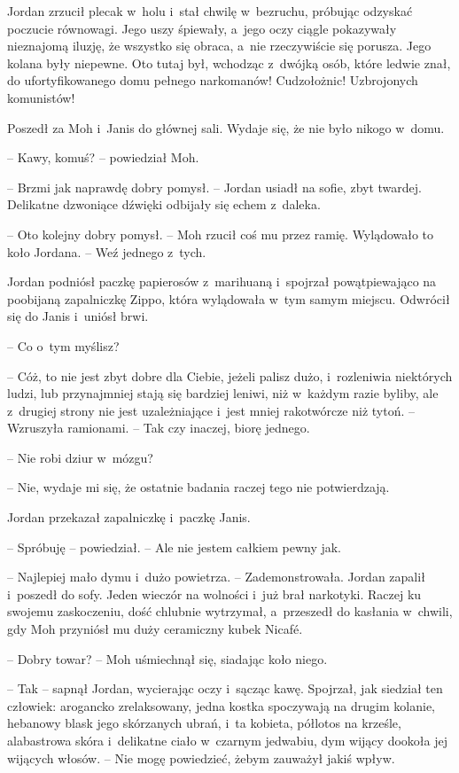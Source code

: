\documentclass[oneside,polish,11pt,sfheadings]{mwbk}
\begin{document}
Jordan zrzucił plecak w~holu i~stał chwilę w~bezruchu, próbując odzyskać
poczucie równowagi. Jego uszy śpiewały, a~jego oczy ciągle pokazywały
nieznajomą iluzję, że wszystko się obraca, a~nie rzeczywiście się
porusza. Jego kolana były niepewne. Oto tutaj był, wchodząc z~dwójką
osób, które ledwie znał, do ufortyfikowanego domu pełnego narkomanów!
Cudzołożnic! Uzbrojonych komunistów!

Poszedł za Moh i~Janis do głównej sali. Wydaje się, że nie było nikogo w~domu.

-- Kawy, komuś? -- powiedział Moh.

-- Brzmi jak naprawdę dobry pomysł. -- Jordan usiadł na sofie, zbyt
twardej. Delikatne dzwoniące dźwięki odbijały się echem z~daleka.

-- Oto kolejny dobry pomysł. -- Moh rzucił coś mu przez ramię. Wylądowało
to koło Jordana. -- Weź jednego z~tych.

Jordan podniósł paczkę papierosów z~marihuaną i~spojrzał powątpiewająco
na poobijaną zapalniczkę Zippo, która wylądowała w~tym samym miejscu.
Odwrócił się do Janis i~uniósł brwi. 

-- Co o~tym myślisz?

-- Cóż, to nie jest zbyt dobre dla Ciebie, jeżeli palisz dużo, i~rozleniwia niektórych ludzi, lub przynajmniej stają się bardziej leniwi,
niż w~każdym razie byliby, ale z~drugiej strony nie jest uzależniające i~jest mniej rakotwórcze niż tytoń. -- Wzruszyła ramionami. -- Tak czy
inaczej, biorę jednego.

-- Nie robi dziur w~mózgu?

-- Nie, wydaje mi się, że ostatnie badania raczej tego nie potwierdzają.

Jordan przekazał zapalniczkę i~paczkę Janis.

-- Spróbuję -- powiedział. -- Ale nie jestem całkiem pewny jak.

-- Najlepiej mało dymu i~dużo powietrza. -- Zademonstrowała. Jordan
zapalił i~poszedł do sofy. Jeden wieczór na wolności i~już brał
narkotyki. Raczej ku swojemu zaskoczeniu, dość chlubnie wytrzymał, a~przeszedł do kasłania w~chwili, gdy Moh przyniósł mu duży ceramiczny
kubek Nicafé.

-- Dobry towar? -- Moh uśmiechnął się, siadając koło niego.

-- Tak -- sapnął Jordan, wycierając oczy i~sącząc kawę. Spojrzał, jak
siedział ten człowiek: arogancko zrelaksowany, jedna kostka spoczywają
na drugim kolanie, hebanowy blask jego skórzanych ubrań, i~ta kobieta,
półlotos na krześle, alabastrowa skóra i~delikatne ciało w~czarnym
jedwabiu, dym wijący dookoła jej wijących włosów. -- Nie mogę powiedzieć,
żebym zauważył jakiś wpływ.
\end{document}
